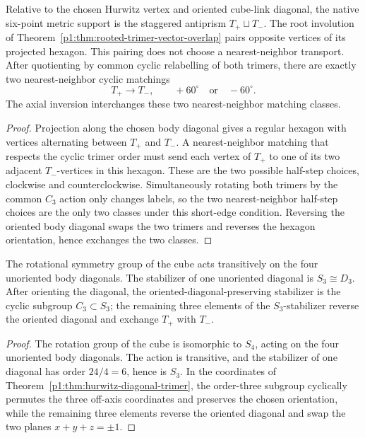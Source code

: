 \documentclass[11pt]{article}
\begin{document}
\begin{proposition}
\label{p1:prop:antiprism-transport-matchings}
Relative to the chosen Hurwitz vertex and oriented cube-link diagonal,
the native six-point metric support is the staggered antiprism
\(T_+\sqcup T_-\).
The root involution of
Theorem~\ref{p1:thm:rooted-trimer-vector-overlap}
pairs opposite vertices of its projected hexagon.
This pairing does not choose a nearest-neighbor transport.
After quotienting by common cyclic relabelling of both trimers,
there are exactly two nearest-neighbor cyclic matchings
\[
 T_+\longrightarrow T_-,\qquad +60^\circ\quad\text{or}\quad-60^\circ.
\]
The axial inversion interchanges these two nearest-neighbor
matching classes.
\end{proposition}

\begin{proof}
Projection along the chosen body diagonal gives a regular hexagon with vertices
alternating between \(T_+\) and \(T_-\).  A nearest-neighbor matching that respects
the cyclic trimer order must send each vertex of \(T_+\) to one of its two
adjacent \(T_-\)-vertices in this hexagon.  These are the two possible half-step
choices, clockwise and counterclockwise.  Simultaneously rotating both trimers by
the common \(C_3\) action only changes labels, so the two nearest-neighbor
half-step choices are the only two classes under this short-edge condition.
Reversing the oriented body diagonal swaps the two trimers and reverses the
hexagon orientation, hence exchanges the two classes.
\end{proof}

\begin{proposition}
\label{p1:prop:diagonal-equivalence}
The rotational symmetry group of the cube acts transitively on the four
unoriented body diagonals.  The stabilizer of one unoriented diagonal is
\(S_3\cong D_3\).  After orienting the diagonal, the oriented-diagonal-preserving
stabilizer is the cyclic subgroup \(C_3\subset S_3\); the remaining three
elements of the \(S_3\)-stabilizer reverse the oriented diagonal and exchange
\(T_+\) with \(T_-\).
\end{proposition}

\begin{proof}
The rotation group of the cube is isomorphic to \(S_4\), acting on the four
unoriented body diagonals.  The action is transitive, and the stabilizer of one
diagonal has order \(24/4=6\), hence is \(S_3\).  In the coordinates of
Theorem~\ref{p1:thm:hurwitz-diagonal-trimer}, the order-three subgroup cyclically
permutes the three off-axis coordinates and preserves the chosen orientation,
while the remaining three elements reverse the oriented diagonal and swap the two
planes \(x+y+z=\pm1\).
\end{proof}
\end{document}
